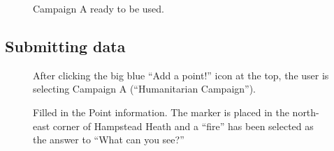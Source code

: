 \documentclass{article}
\begin{document}
		\begin{figure}[H]
			\centering
			\caption{Campaign A ready to be used.}
			\label{fig:eval-ca-4}
		\end{figure}

		\FloatBarrier

		\subsection{Submitting data}

		\begin{figure}[H]
			\centering
			\caption{After clicking the big blue ``Add a point!'' icon at the top, the user is selecting Campaign A (``Humanitarian Campaign'').}
			\label{fig:eval-submita-1}
		\end{figure}

		\begin{figure}[H]
			\centering
			\caption{Filled in the Point information. The marker is placed in the north-east corner of Hampstead Heath and a ``fire'' has been selected as the answer to ``What can you see?''}
			\label{fig:eval-submita-2}
		\end{figure}
\end{document}
